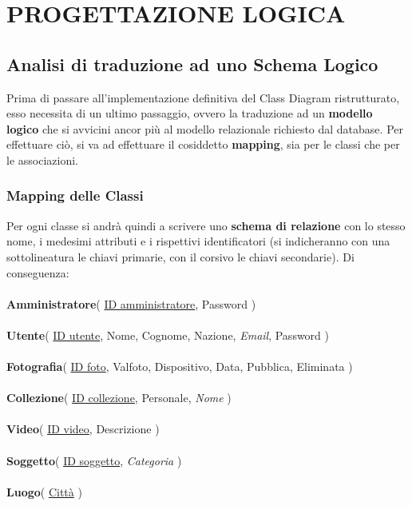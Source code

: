 \documentclass[a4paper]{article}
\begin{document}
	
\vspace{45pt}
\section{PROGETTAZIONE LOGICA}
\vspace{12pt}
	\subsection{Analisi di traduzione ad uno Schema Logico}
	\vspace{8pt}
	Prima di passare all'implementazione definitiva del
	Class Diagram ristrutturato, esso necessita di un
	ultimo passaggio, ovvero la traduzione ad un
	\textbf{modello logico} che si avvicini ancor più al
	modello relazionale richiesto dal database. Per
	effettuare ciò, si va ad effettuare il cosiddetto 
	\textbf{mapping}, sia per le classi che per le
	associazioni. 
	\vspace{15pt}

		\subsubsection{Mapping delle Classi}
		\vspace{5pt}
		Per ogni classe si andrà quindi a scrivere uno
		\textbf{schema di
		relazione} con lo stesso nome, i
		medesimi attributi e i rispettivi identificatori
		(si indicheranno con
		una sottolineatura le chiavi primarie, con il corsivo
		le chiavi secondarie). Di conseguenza:
		\\
		\\
		\textbf{Amministratore}( \underline{ID
		amministratore}, Password )
		\\\\
		\textbf{Utente}( \underline{ID utente}, Nome,
		Cognome, Nazione, \emph{Email}, Password )
		\\\\		
		\textbf{Fotografia}( \underline{ID foto}, 
		Val\textunderscore foto, Dispositivo, Data, Pubblica,
		Eliminata )
		\\\\
		\textbf{Collezione}( \underline{ID collezione}, 
		Personale, \emph{Nome} )
		\\\\	
		\textbf{Video}( \underline{ID video}, Descrizione )
		\\\\	
		\textbf{Soggetto}( \underline{ID soggetto},
		\emph{Categoria} )
		\\\\
		\textbf{Luogo}( \underline{Città} )
		\\\\	
		
\end{document}
